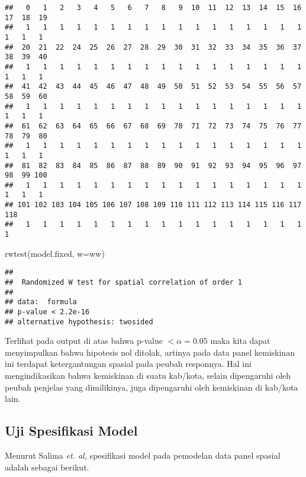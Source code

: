 \documentclass[
]{book}
\newenvironment{Shaded}{\begin{snugshade}}{\end{snugshade}}
\newcommand{\AttributeTok}[1]{\textcolor[rgb]{0.77,0.63,0.00}{#1}}
\newcommand{\FunctionTok}[1]{\textcolor[rgb]{0.00,0.00,0.00}{#1}}
\newcommand{\NormalTok}[1]{#1}
\begin{document}
\begin{verbatim}
##   0   1   2   3   4   5   6   7   8   9  10  11  12  13  14  15  16  17  18  19 
##   1   1   1   1   1   1   1   1   1   1   1   1   1   1   1   1   1   1   1   1 
##  20  21  22  24  25  26  27  28  29  30  31  32  33  34  35  36  37  38  39  40 
##   1   1   1   1   1   1   1   1   1   1   1   1   1   1   1   1   1   1   1   1 
##  41  42  43  44  45  46  47  48  49  50  51  52  53  54  55  56  57  58  59  60 
##   1   1   1   1   1   1   1   1   1   1   1   1   1   1   1   1   1   1   1   1 
##  61  62  63  64  65  66  67  68  69  70  71  72  73  74  75  76  77  78  79  80 
##   1   1   1   1   1   1   1   1   1   1   1   1   1   1   1   1   1   1   1   1 
##  81  82  83  84  85  86  87  88  89  90  91  92  93  94  95  96  97  98  99 100 
##   1   1   1   1   1   1   1   1   1   1   1   1   1   1   1   1   1   1   1   1 
## 101 102 103 104 105 106 107 108 109 110 111 112 113 114 115 116 117 118 
##   1   1   1   1   1   1   1   1   1   1   1   1   1   1   1   1   1   1
\end{verbatim}

\begin{Shaded}
\begin{Highlighting}[]
\FunctionTok{rwtest}\NormalTok{(model.fixed, }\AttributeTok{w=}\NormalTok{ww)}
\end{Highlighting}
\end{Shaded}

\begin{verbatim}
## 
##  Randomized W test for spatial correlation of order 1
## 
## data:  formula
## p-value < 2.2e-16
## alternative hypothesis: twosided
\end{verbatim}

Terlihat pada output di atas bahwa p-value \(<\alpha=0.05\) maka kita dapat menyimpulkan bahwa hipotesis nol ditolak, artinya pada data panel kemiskinan ini terdapat ketergantungan spasial pada peubah responnya. Hal ini mengindikasikan bahwa kemiskinan di suatu kab/kota, selain dipengaruhi oleh peubah penjelas yang dimilikinya, juga dipengaruhi oleh kemiskinan di kab/kota lain.

\hypertarget{uji-spesifikasi-model}{%
\subsection{Uji Spesifikasi Model}\label{uji-spesifikasi-model}}

Menurut Salima \emph{et. al,} spesifikasi model pada pemodelan data panel spasial adalah sebagai berikut.
\end{document}
